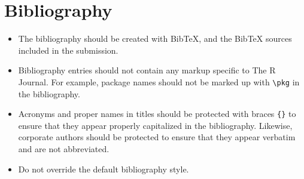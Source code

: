 \documentclass[11pt]{article}
\begin{document}
\section*{Bibliography}

\begin{itemize}
\item The bibliography should be created with BibTeX, and the BibTeX
  sources included in the submission.
\item Bibliography entries should not contain any markup specific to
  The R Journal. For example, package names should not be marked up
  with \verb+\pkg+ in the bibliography.
\item Acronyms and proper names in titles should be protected with
  braces \verb+{}+ to ensure that they appear properly capitalized
  in the bibliography. Likewise, corporate authors should be
  protected to ensure that they appear verbatim and are not abbreviated.
\item Do not override the default bibliography style.
\end{itemize}
\end{document}
